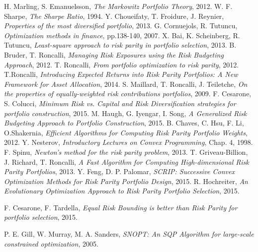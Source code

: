 \documentclass[a4paper,12pt,oneside]{book}
\numberwithin{equation}{section}
\begin{document}
\begin{thebibliography}{9}
  H. Marling, S. Emanuelsson,
  \emph{The Markowitz Portfolio Theory},
  2012.
  W. F. Sharpe,
  \emph{The Sharpe Ratio},
  1994.
  Y. Choueifaty, T. Froidure, J. Reynier,
  \emph{Properties of the most diversified portfolio},
  2013. 
  G. Cornuejols, R. Tutuncu,
  \emph{Optimization methods in finance}, pp.138-140,
   2007.
  X. Bai, K. Scheinberg, R. Tutuncu,
  \emph{Least-square approach to risk parity in portfolio selection},
  2013.   
  B. Bruder, T. Roncalli,
  \emph{Managing Risk Exposures using the Risk Budgeting Approach},
  2012.   
  T. Roncalli,
  \emph{From portfolio optimization to risk parity},
  2012.
  T.Roncalli,
  \emph{Introducing Expected Returns into Risk Parity Portfolios: A New Framework for Asset Allocation},
  2014.   
  S. Maillard, T. Roncalli, J. Teiletche,
  \emph{On the properties of equally-weighted risk contributions portfolios},
  2009.
  F. Cesarone, S. Colucci,
  \emph{Minimum Risk vs. Capital and Risk Diversification strategies for portfolio construction},
  2015.  
  M. Haugh, G. Iyengar, I. Song, 
  \emph{A Generalized Risk Budgeting Approach to Portfolio Construction},
  2015.
  B. Chaves, C. Hsu, F. Li, O.Shakernia,
  \emph{Efficient Algorithms for Computing Risk Parity Portfolio Weights},
  2012.
  Y. Nesterov,
  \emph{Introductory Lectures on Convex Programming}, Chap. 4,
  1998.
  F. Spinu,
  \emph{Newton's method for the risk parity problem},
  2013.
  T. Griveau-Billion, J. Richard, T. Roncalli,
  \emph{A Fast Algorithm for Computing High-dimensional Risk Parity Portfolios},
  2013.
  Y. Feng, D. P. Palomar,
  \emph{SCRIP: Successive Convex Optimization Methods for Risk Parity Portfolio Design},
  2015.
   R. Hochreiter,
  \emph{An Evolutionary Optimization Approach to Risk Parity Portfolio Selection},
  2015.
  
  F. Cesarone, F. Tardella,		
  \emph{Equal Risk Bounding is better than Risk Parity for portfolio selection},
  2015.
  
	P. E. Gill, W. Murray, M. A. Sanders,
	\emph{SNOPT: An SQP Algorithm for large-scale constrained optimization}, 
	2005.
  
\end{thebibliography}
\end{document}
